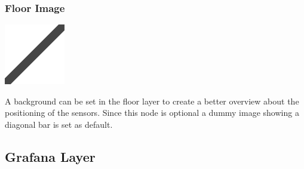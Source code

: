 \subsubsection{Floor Image}
\noindent\begin{minipage}{0.15\textwidth}%
\includegraphics[width=\linewidth]{assets/images/dummy2}
\end{minipage}%
\hfill%
\begin{minipage}{0.8\textwidth}
A background can be set in the floor layer to create a better overview about the positioning of the sensors. Since this node is optional a dummy image showing a diagonal bar is set as default.
\end{minipage}


\subsection{Grafana Layer}

